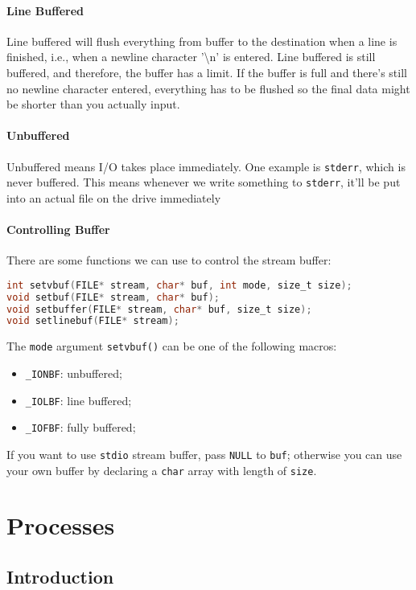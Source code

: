 \documentclass{article}
\renewcommand{\b}{\item[$\circ$]}
\newcommand{\newlist}{\begin{itemize}}
\renewcommand{\endlist}{\end{itemize}}
\newcommand{\code}[1]{\texttt{#1}}
\begin{document}
\paragraph{Line Buffered}

Line buffered will flush everything from buffer to the destination when a line is finished, i.e., when a newline character '\textbackslash n' is entered. Line buffered is still buffered, and therefore, the buffer has a limit. If the buffer is full and there's still no newline character entered, everything has to be flushed so the final data might be shorter than you actually input. 

\paragraph{Unbuffered}

Unbuffered means I/O takes place immediately. One example is \code{stderr}, which is never buffered. This means whenever we write something to \code{stderr}, it'll be put into an actual file on the drive immediately 

\paragraph{Controlling Buffer}

There are some functions we can use to control the stream buffer:

\begin{lstlisting}[language=C]
int setvbuf(FILE* stream, char* buf, int mode, size_t size);
void setbuf(FILE* stream, char* buf);
void setbuffer(FILE* stream, char* buf, size_t size);
void setlinebuf(FILE* stream);
\end{lstlisting}

\noindent The \code{mode} argument \code{setvbuf()} can be one of the following macros:

\newlist
\b \code{\_IONBF}: unbuffered;
\b \code{\_IOLBF}: line buffered;
\b \code{\_IOFBF}: fully buffered;
\endlist

\noindent If you want to use \code{stdio} stream buffer, pass \code{NULL} to \code{buf}; otherwise you can use your own buffer by declaring a \code{char} array with length of \code{size}.

\newpage
\section{Processes}

\subsection{Introduction}
\end{document}
